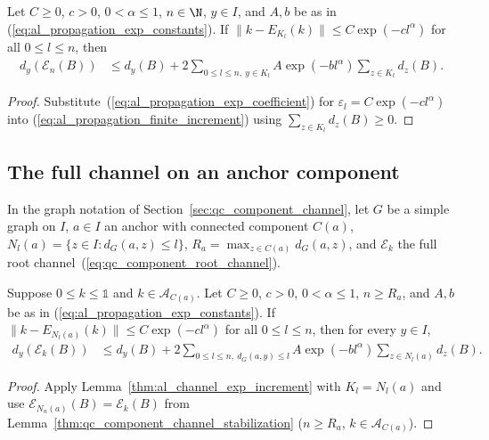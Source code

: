 \begin{lemma}
    \label{thm:al_channel_exp_increment}
    \leanok
    Let $C\ge0$, $c>0$, $0<\alpha\le1$, $n\in\N$, $y\in I$, and $A,b$ be as in
    (\ref{eq:al_propagation_exp_constants}). If
    $\|k-E_{K_l}(k)\|\le C\exp(-cl^\alpha)$ for all $0\le l\le n$, then
    \begin{align}
        \label{eq:al_propagation_exp_increment}
        d_y(\mathcal E_n(B))
         & \le d_y(B)+2\sum_{0\le l\le n,\ y\in K_l}
        A\exp(-bl^\alpha)\sum_{z\in K_l}d_z(B).
    \end{align}
\end{lemma}
\begin{proof}
    \leanok
    Substitute~(\ref{eq:al_propagation_exp_coefficient}) for
    $\varepsilon_l=C\exp(-cl^\alpha)$ into
    (\ref{eq:al_propagation_finite_increment}) using
    $\sum_{z\in K_l}d_z(B)\ge0$.
\end{proof}

\subsection{The full channel on an anchor component}

In the graph notation of Section~\ref{sec:qc_component_channel}, let $G$ be a
simple graph on $I$, $a\in I$ an anchor with connected component $C(a)$,
$N_l(a)=\{z\in I:d_G(a,z)\le l\}$, $R_a=\max_{z\in C(a)}d_G(a,z)$, and
$\mathcal E_k$ the full root channel~(\ref{eq:qc_component_root_channel}).

\begin{lemma}
    \label{thm:al_graph_channel_exp_increment}
    \leanok
    Suppose $0\le k\le\mathbb 1$ and $k\in\mathcal A_{C(a)}$. Let $C\ge0$,
    $c>0$, $0<\alpha\le1$, $n\ge R_a$, and $A,b$ be as in
    (\ref{eq:al_propagation_exp_constants}). If
    $\|k-E_{N_l(a)}(k)\|\le C\exp(-cl^\alpha)$ for all $0\le l\le n$, then for
    every $y\in I$,
    \begin{align}
        \label{eq:al_propagation_graph_increment}
        d_y(\mathcal E_k(B))
         & \le d_y(B)+2\sum_{0\le l\le n,\ d_G(a,y)\le l}
        A\exp(-bl^\alpha)\sum_{z\in N_l(a)}d_z(B).
    \end{align}
\end{lemma}
\begin{proof}
    \leanok
    Apply Lemma~\ref{thm:al_channel_exp_increment} with $K_l=N_l(a)$ and use
    $\mathcal E_{N_n(a)}(B)=\mathcal E_k(B)$ from
    Lemma~\ref{thm:qc_component_channel_stabilization} ($n\ge R_a$,
    $k\in\mathcal A_{C(a)}$).
\end{proof}

